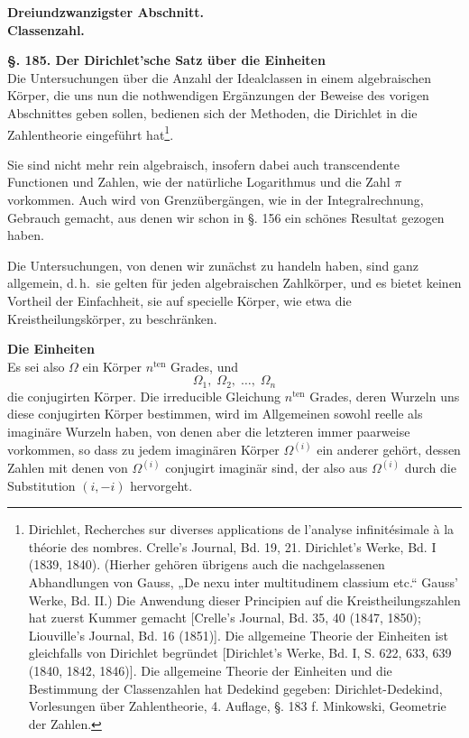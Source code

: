 \documentclass[12pt,a4paper]{article}
\begin{document}
\bigskip
\begin{center}
\textbf{Dreiundzwanzigster Abschnitt.}\\[4pt]
\textbf{Classenzahl.}
\end{center}
\bigskip

\noindent\textbf{\S. 185. Der Dirichlet'sche Satz über die Einheiten}\\[4pt]

Die Untersuchungen über die Anzahl der Idealclassen in einem algebraischen Körper, die uns nun die nothwendigen Ergänzungen der Beweise des vorigen Abschnittes geben sollen, bedienen sich der Methoden, die Dirichlet in die Zahlentheorie eingeführt hat\footnote{Dirichlet, Recherches sur diverses applications de l'analyse infinitésimale à la théorie des nombres. Crelle's Journal, Bd. 19, 21. Dirichlet's Werke, Bd. I (1839, 1840). (Hierher gehören übrigens auch die nachgelassenen Abhandlungen von Gauss, „De nexu inter multitudinem classium etc.`` Gauss' Werke, Bd. II.) Die Anwendung dieser Principien auf die Kreistheilungszahlen hat zuerst Kummer gemacht [Crelle's Journal, Bd. 35, 40 (1847, 1850); Liouville's Journal, Bd. 16 (1851)]. Die allgemeine Theorie der Einheiten ist gleichfalls von Dirichlet begründet [Dirichlet's Werke, Bd. I, S. 622, 633, 639 (1840, 1842, 1846)]. Die allgemeine Theorie der Einheiten und die Bestimmung der Classenzahlen hat Dedekind gegeben: Dirichlet-Dedekind, Vorlesungen über Zahlentheorie, 4. Auflage, \S. 183 f. Minkowski, Geometrie der Zahlen.}.

Sie sind nicht mehr rein algebraisch, insofern dabei auch transcendente Functionen und Zahlen, wie der natürliche Logarithmus und die Zahl $\pi$ vorkommen. Auch wird von Grenzübergängen, wie in der Integralrechnung, Gebrauch gemacht, aus denen wir schon in \S. 156 ein schönes Resultat gezogen haben.

Die Untersuchungen, von denen wir zunächst zu handeln haben, sind ganz allgemein, d.\,h.\ sie gelten für jeden algebraischen Zahlkörper, und es bietet keinen Vortheil der Einfachheit, sie auf specielle Körper, wie etwa die Kreistheilungskörper, zu beschränken.

\bigskip\noindent\textbf{Die Einheiten}\\[4pt]

Es sei also $\Omega$ ein Körper $n^{\text{ten}}$ Grades, und
\begin{equation}\label{eq:185-1}
\Omega_1,\; \Omega_2,\; \ldots,\; \Omega_n
\end{equation}
die conjugirten Körper. Die irreducible Gleichung $n^{\text{ten}}$ Grades, deren Wurzeln uns diese conjugirten Körper bestimmen, wird im Allgemeinen sowohl reelle als imaginäre Wurzeln haben, von denen aber die letzteren immer paarweise vorkommen, so dass zu jedem imaginären Körper $\Omega^{(i)}$ ein anderer gehört, dessen Zahlen mit denen von $\Omega^{(i)}$ conjugirt imaginär sind, der also aus $\Omega^{(i)}$ durch die Substitution $(i, -i)$ hervorgeht.
\end{document}
